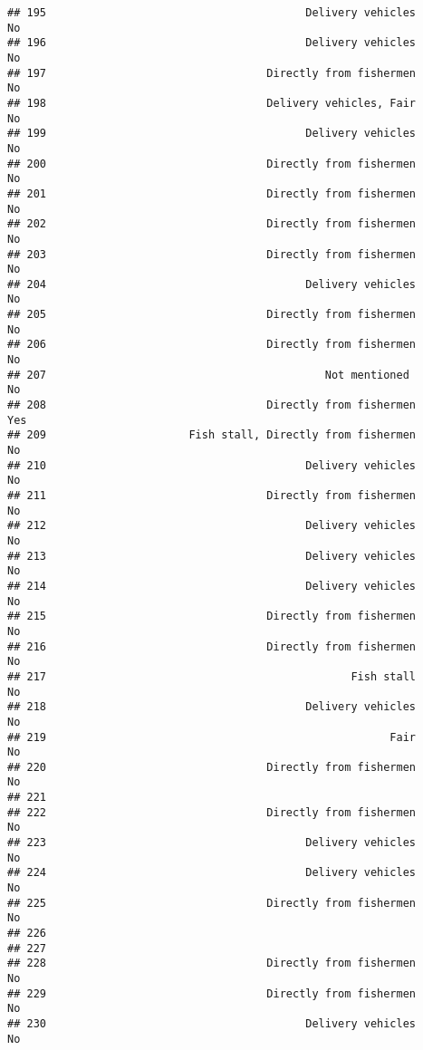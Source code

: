 \documentclass[
]{article}
\begin{document}
\begin{verbatim}
## 195                                        Delivery vehicles        No
## 196                                        Delivery vehicles        No
## 197                                  Directly from fishermen        No
## 198                                  Delivery vehicles, Fair        No
## 199                                        Delivery vehicles        No
## 200                                  Directly from fishermen        No
## 201                                  Directly from fishermen        No
## 202                                  Directly from fishermen        No
## 203                                  Directly from fishermen        No
## 204                                        Delivery vehicles        No
## 205                                  Directly from fishermen        No
## 206                                  Directly from fishermen        No
## 207                                           Not mentioned         No
## 208                                  Directly from fishermen       Yes
## 209                      Fish stall, Directly from fishermen        No
## 210                                        Delivery vehicles        No
## 211                                  Directly from fishermen        No
## 212                                        Delivery vehicles        No
## 213                                        Delivery vehicles        No
## 214                                        Delivery vehicles        No
## 215                                  Directly from fishermen        No
## 216                                  Directly from fishermen        No
## 217                                               Fish stall        No
## 218                                        Delivery vehicles        No
## 219                                                     Fair        No
## 220                                  Directly from fishermen        No
## 221                                                                   
## 222                                  Directly from fishermen        No
## 223                                        Delivery vehicles        No
## 224                                        Delivery vehicles        No
## 225                                  Directly from fishermen        No
## 226                                                                   
## 227                                                                   
## 228                                  Directly from fishermen        No
## 229                                  Directly from fishermen        No
## 230                                        Delivery vehicles        No

\end{verbatim}
\end{document}
